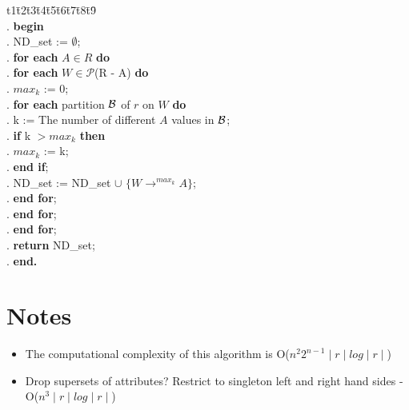 \begin{minipage}{16cm}
\begin{algorithm}[{\rm ND\_mine}($r$, $R$)]\label{alg:mine}
\begin{rm}
\begin{tabbing}
t1\=t2\=t3\=t4\=t5\=t6\=t7\=t8\=t9\= \kill \\
\na.  \> \> {\bf begin} \\
\sa.  \> \> \> ND\_set := $\emptyset$;\\
\sa.  \> \> \> {\bf for each} $A \in R$ {\bf do}\\
\sa.  \> \> \> \> {\bf for each} $W \in \mathcal{P}$(R - A) {\bf do}\\
\sa.  \> \> \> \> \>  $max_k$ := 0; \\
\sa.  \> \> \> \> \>   {\bf for each} partition ${\cal B}$ of $r$ on
$W$ {\bf do}\\
\sa.  \> \> \> \> \> \>  k := The number of different $A$ values in ${\cal B}$; \\
\sa.  \> \> \>  \> \> \> {\bf if } k $> max_k$ {\bf then} \\
\sa.  \> \> \> \> \>\>   \>$max_k$ := k; \\
\sa. \> \> \> \> \> \>  {\bf end if}; \\
\sa.  \> \> \> \> \>  \> ND\_set := ND\_set $\cup$ $\{ W \to^{max_k} A \}$; \\
\sa. \> \> \>  \> \>  {\bf end for}; \\
\sa. \> \> \>  \>   {\bf end for}; \\
\sa. \> \> \>    {\bf end for}; \\
\sa. \> \> \> {\bf return} ND\_set;  \\
\sa. \> \> {\bf end.}
\end{tabbing}
\end{rm}
\end{algorithm}
\end{minipage}

\medskip

\section{Notes}

\begin{itemize}
\item The computational complexity of this algorithm is O($n^2 2^{n-1}
\mid r \mid log \mid r \mid$)
\item Drop supersets of attributes? Restrict to singleton left and right
hand sides - O($n^3\mid r \mid log \mid r \mid$)
\end{itemize}


